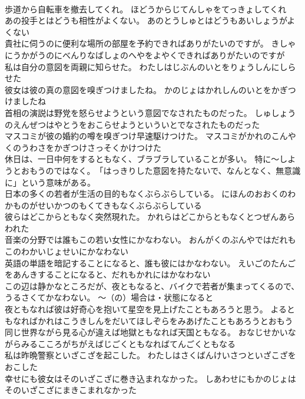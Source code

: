 \documentclass[8pt]{extreport}
\begin{document}
\begin{CJK}{UTF8}{min}
\\	歩道から自転車を撤去してくれ。	ほどうからじてんしゃをてっきょしてくれ 
\\	あの投手とはどうも相性がよくない。	あのとうしゅとはどうもあいしょうがよくない 
\\	貴社に伺うのに便利な場所の部屋を予約できればありがたいのですが。	きしゃにうかがうのにべんりなばしょのへやをよやくできればありがたいのですが 
\\	私は自分の意図を両親に知らせた。	わたしはじぶんのいとをりょうしんにしらせた 
\\	彼女は彼の真の意図を嗅ぎつけましたね。	かのじょはかれしんのいとをかぎつけましたね 
\\	首相の演説は野党を怒らせようという意図でなされたものだった。	しゅしょうのえんぜつはやとうをおこらせようといういとでなされたものだった 
\\	マスコミが彼の婚約の噂を嗅ぎつけ早速駆けつけた。	マスコミがかれのこんやくのうわさをかぎつけさっそくかけつけた 
\\	休日は、一日中何をするともなく、ブラブラしていることが多い。	特に～しようとおもうのではなく。　「はっきりした意図を持たないで、なんとなく、無意識に」という意味がある。
\\	日本の多くの若者が生活の目的もなくぶらぶらしている。	にほんのおおくのわかものがせいかつのもくてきもなくぶらぶらしている 
\\	彼らはどこからともなく突然現れた。	かれらはどこからともなくとつぜんあらわれた 
\\	音楽の分野では誰もこの若い女性にかなわない。	おんがくのぶんやではだれもこのわかいじょせいにかなわない 
\\	英語の単語を暗記することになると、誰も彼にはかなわない。	えいごのたんごをあんきすることになると、だれもかれにはかなわない 
\\	この辺は静かなところだが、夜ともなると、バイクで若者が集まってくるので、うるさくてかなわない。	～（の）場合は・状態になると
\\	夜ともなれば彼は好奇心を抱いて星空を見上げたこともあろうと思う。	よるともなればかれはこうきしんをだいてほしぞらをみあげたこともあろうとおもう 
\\	同じ世界ながら見る心が違えば地獄ともなれば天国ともなる。	おなじせかいながらみるこころがちがえばじごくともなればてんごくともなる 
\\	私は昨晩警察といざこざを起こした。	わたしはさくばんけいさつといざこざをおこした 
\\	幸せにも彼女はそのいざこざに巻き込まれなかった。	しあわせにもかのじょはそのいざこざにまきこまれなかった 

\end{CJK}
\end{document}
